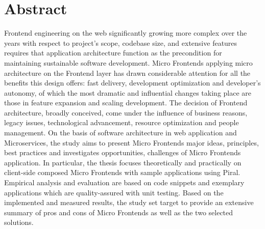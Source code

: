 \documentclass[a4paper]{book}
\begin{document}
\section*{Abstract}
Frontend engineering on the web significantly growing more complex over the years with respect to project's scope, codebase size, and extensive features requires that application architecture function as the precondition for maintaining sustainable software development. Micro Frontends applying micro architecture on the Frontend layer has drawn considerable attention for all the benefits this design offers: fast delivery, development optimization and developer's autonomy, of which the most dramatic and influential changes taking place are those in feature expansion and scaling development. The decision of Frontend architecture, broadly conceived, come under the influence of business reasons, legacy issues, technological advancement, resource optimization and people management. On the basis of software architecture in web application and Microservices, the study aims to present Micro Frontends major ideas, principles, best practices and investigates opportunities, challenges of Micro Frontends application. In particular, the thesis focuses theoretically and practically on client-side composed Micro Frontends with sample applications using Piral. Empirical analysis and evaluation are based on code snippets and exemplary applications which are quality-assured with unit testing. Based on the implemented and measured results, the study set target to provide an extensive summary of pros and cons of Micro Frontends as well as the two selected solutions. 
\end{document}
